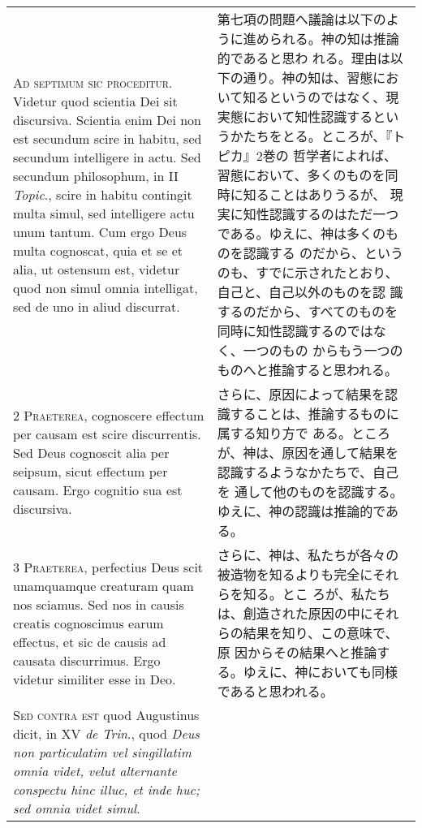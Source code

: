\documentclass[10pt]{jsarticle} %
\begin{document}
\begin{longtable}{p{21em}p{21em}}


{\huge A}{\scshape d septimum sic proceditur}. Videtur quod scientia
Dei sit discursiva. Scientia enim Dei non est secundum scire in
habitu, sed secundum intelligere in actu. Sed secundum philosophum, in
II {\itshape Topic}., scire in habitu contingit multa simul, sed
intelligere actu unum tantum. Cum ergo Deus multa cognoscat, quia et
se et alia, ut ostensum est, videtur quod non simul omnia intelligat,
sed de uno in aliud discurrat.

&


第七項の問題へ議論は以下のように進められる。神の知は推論的であると思わ
れる。理由は以下の通り。神の知は、習態において知るというのではなく、現
実態において知性認識するというかたちをとる。ところが、『トピカ』2巻の
哲学者によれば、習態において、多くのものを同時に知ることはありうるが、
現実に知性認識するのはただ一つである。ゆえに、神は多くのものを認識する
のだから、というのも、すでに示されたとおり、自己と、自己以外のものを認
識するのだから、すべてのものを同時に知性認識するのではなく、一つのもの
からもう一つのものへと推論すると思われる。

\\


{\scshape 2 Praeterea}, cognoscere effectum per causam est scire
discurrentis. Sed Deus cognoscit alia per seipsum, sicut effectum per
causam. Ergo cognitio sua est discursiva.

&

さらに、原因によって結果を認識することは、推論するものに属する知り方で
ある。ところが、神は、原因を通して結果を認識するようなかたちで、自己を
通して他のものを認識する。ゆえに、神の認識は推論的である。

\\


{\scshape 3 Praeterea}, perfectius Deus scit unamquamque creaturam
quam nos sciamus. Sed nos in causis creatis cognoscimus earum
effectus, et sic de causis ad causata discurrimus. Ergo videtur
similiter esse in Deo.

&

さらに、神は、私たちが各々の被造物を知るよりも完全にそれらを知る。とこ
ろが、私たちは、創造された原因の中にそれらの結果を知り、この意味で、原
因からその結果へと推論する。ゆえに、神においても同様であると思われる。

\\


{\scshape Sed contra est} quod Augustinus dicit, in XV {\itshape de
Trin}., quod {\itshape Deus non particulatim vel singillatim omnia
videt, velut alternante conspectu hinc illuc, et inde huc; sed omnia
videt simul}.


\end{longtable}
\end{document}
